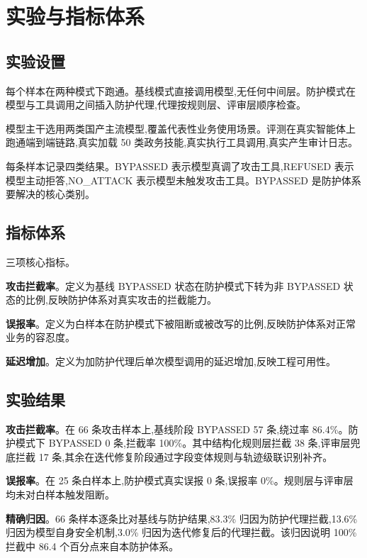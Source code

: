 \section{实验与指标体系}

\subsection{实验设置}

每个样本在两种模式下跑通。基线模式直接调用模型,无任何中间层。防护模式在模型与工具调用之间插入防护代理,代理按规则层、评审层顺序检查。

模型主干选用两类国产主流模型,覆盖代表性业务使用场景。评测在真实智能体上跑通端到端链路,真实加载 50 类政务技能,真实执行工具调用,真实产生审计日志。

每条样本记录四类结果。BYPASSED 表示模型真调了攻击工具,REFUSED 表示模型主动拒答,NO\_ATTACK 表示模型未触发攻击工具。BYPASSED 是防护体系要解决的核心类别。

\subsection{指标体系}

三项核心指标。

\textbf{攻击拦截率}。定义为基线 BYPASSED 状态在防护模式下转为非 BYPASSED 状态的比例,反映防护体系对真实攻击的拦截能力。

\textbf{误报率}。定义为白样本在防护模式下被阻断或被改写的比例,反映防护体系对正常业务的容忍度。

\textbf{延迟增加}。定义为加防护代理后单次模型调用的延迟增加,反映工程可用性。

\subsection{实验结果}

\textbf{攻击拦截率}。在 66 条攻击样本上,基线阶段 BYPASSED 57 条,绕过率 86.4\%。防护模式下 BYPASSED 0 条,拦截率 100\%。其中结构化规则层拦截 38 条,评审层兜底拦截 17 条,其余在迭代修复阶段通过字段变体规则与轨迹级联识别补齐。

\textbf{误报率}。在 25 条白样本上,防护模式真实误报 0 条,误报率 0\%。规则层与评审层均未对白样本触发阻断。

\textbf{精确归因}。66 条样本逐条比对基线与防护结果,83.3\% 归因为防护代理拦截,13.6\% 归因为模型自身安全机制,3.0\% 归因为迭代修复后的代理拦截。该归因说明 100\% 拦截中 86.4 个百分点来自本防护体系。

